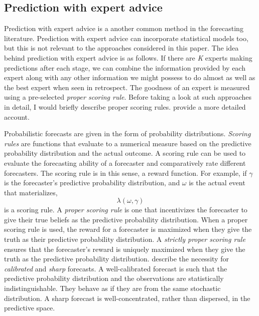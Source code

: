 \documentclass{article}
\begin{document}
\subsection{Prediction with expert advice}
\label{predWithExpert}
Prediction with expert advice is a another common method in the forecasting literature. Prediction with expert advice can incorporate statistical models too, but this is not relevant to the approaches considered in this paper. The idea behind prediction with expert advice is as follows. If there are \textit{K} experts making predictions after each stage, we can combine the information provided by each expert along with any other information we might possess to do almost as well as the best expert when seen in retrospect. The goodness of an expert is measured using a pre-selected \textit{proper scoring rule}. Before taking a look at such approaches in detail, I would briefly describe proper scoring rules. \cite{gneiting2007strictly} provide a more detailed account. 

Probabilistic forecasts are given in the form of probability distributions. \textit{Scoring rules} are functions that evaluate to a numerical measure based on the predictive probability distribution and the actual outcome. A scoring rule can be used to evaluate the forecasting ability of a forecaster and comparatively rate different forecasters. The scoring rule is in this sense, a reward function. For example, if $\gamma$ is the forecaster's predictive probability distribution, and $\omega$ is the actual event that materializes, 
\[ \lambda(\omega, \gamma)\]
is a scoring rule. A \textit{proper scoring rule} is one that incentivizes the forecaster to give their true beliefs as the predictive probability distribution. When a proper scoring rule is used, the reward for a forecaster is maximized when they give the truth as their predictive probability distribution. A \textit{strictly proper scoring rule} ensures that the forecaster's reward is uniquely maximized when they give the truth as the predictive probability distribution. \cite{gneiting2014probabilistic} describe the necessity for \textit{calibrated} and \textit{sharp} forecasts. A well-calibrated forecast is such that the predictive probability distribution and the observations are statistically indistinguishable. They behave as if they are from the same stochastic distribution. A sharp forecast is well-concentrated, rather than dispersed, in the predictive space. 
\end{document}
